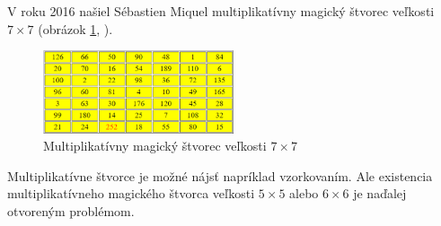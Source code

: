V roku 2016 našiel Sébastien Miquel multiplikatívny magický štvorec veľkosti $7 \times 7$ (obrázok \ref{obr:fig_miquel_addmult_7x7}, \cite{multimagie}).

\begin{figure}[H]
\centerline{\includegraphics[width=0.5\textwidth]{images/miquel_addmult_7x7}}
\caption[Multiplikatívny magický štvorec veľkosti $7 \times 7$]{Multiplikatívny magický štvorec veľkosti $7 \times 7$ \cite{multimagie}}
\label{obr:fig_miquel_addmult_7x7}
\end{figure}

Multiplikatívne štvorce je možné nájsť napríklad vzorkovaním. Ale existencia multiplikatívneho magického štvorca veľkosti $5 \times 5$ alebo $6 \times 6$ je naďalej otvoreným problémom.











